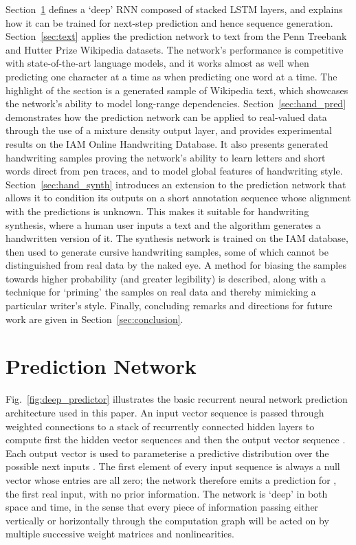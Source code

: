 \documentclass{article}
\newcommand{\seclabel}[1]{\label{sec:#1}}
\newcommand{\fref}[1]{Fig.~\ref{fig:#1}}
\newcommand{\sref}[1]{Section~\ref{sec:#1}}
\begin{document}
\sref{pred_net} defines a `deep' RNN composed of stacked LSTM layers, and explains how it can be trained for next-step prediction and hence sequence generation.
\sref{text} applies the prediction network to text from the Penn Treebank and Hutter Prize Wikipedia datasets.
The network's performance is competitive with state-of-the-art language models, and it works almost as well when predicting one character at a time as when predicting one word at a time.
The highlight of the section is a generated sample of Wikipedia text, which showcases the network's ability to model long-range dependencies.
\sref{hand_pred} demonstrates how the prediction network can be applied to real-valued data through the use of a mixture density output layer, and provides experimental results on the IAM Online Handwriting Database.
It also presents generated handwriting samples proving the network's ability to learn letters and short words direct from pen traces, and to model global features of handwriting style.
\sref{hand_synth} introduces an extension to the prediction network that allows it to condition its outputs on a short annotation sequence whose alignment with the predictions is unknown.
This makes it suitable for handwriting synthesis, where a human user inputs a text and the algorithm generates a handwritten version of it.
The synthesis network is trained on the IAM database, then used to generate cursive handwriting samples, some of which cannot be distinguished from real data by the naked eye.
A method for biasing the samples towards higher probability (and greater legibility) is described, along with a technique for `priming' the samples on real data and thereby mimicking a particular writer's style.
Finally, concluding remarks and directions for future work are given in \sref{conclusion}.


\section{Prediction Network}
\seclabel{pred_net}
\fref{deep_predictor} illustrates the basic recurrent neural network prediction architecture used in this paper.
An input vector sequence  is passed through weighted connections to a stack of  recurrently connected hidden layers to compute first the hidden vector sequences  and then the output vector sequence .
Each output vector  is used to parameterise a predictive distribution  over the possible next inputs .
The first element  of every input sequence is always a null vector whose entries are all zero; the network therefore emits a prediction for , the first real input, with no prior information.
The network is `deep' in both space and time, in the sense that every piece of information passing either vertically or horizontally through the computation graph will be acted on by multiple successive weight matrices and nonlinearities.
\end{document}
